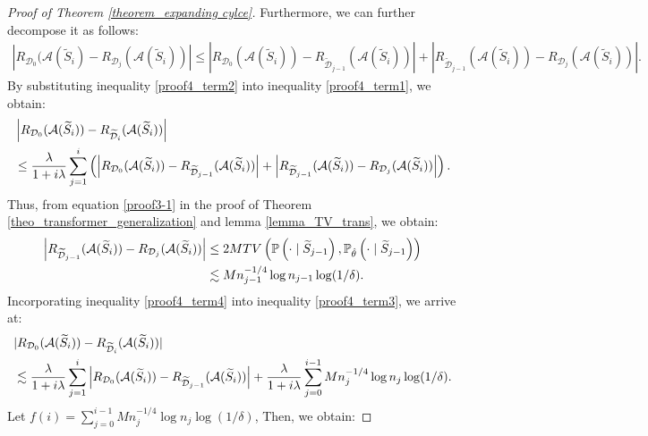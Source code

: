\begin{proof}[Proof of Theorem \ref{theorem_expanding cylce}]
Furthermore, we can further decompose it as follows:
\begin{align}
   \left|R_{\mathcal{D}_0}(\mathcal{A}(\widetilde{S}_i)-R_{\mathcal{D}_j}(\mathcal{A}(\widetilde{S}_i))\right| \leq \left|R_{\mathcal{D}_0}(\mathcal{A}(\widetilde{S}_i))-R_{\widetilde{\mathcal{D}}_{j-1}}(\mathcal{A}(\widetilde{S}_i))\right|+\left|R_{\widetilde{\mathcal{D}}_{j-1}}(\mathcal{A}(\widetilde{S}_i))-R_{\mathcal{D}_{j}}(\mathcal{A}(\widetilde{S}_i))\right|. \label{proof4_term2}
\end{align}
By substituting inequality \ref{proof4_term2} into inequality \ref{proof4_term1}, we obtain:
\begin{align}
    &\left|R_{\mathcal{D}_0}(\mathcal{A}(\widetilde{S}_i))-R_{\widetilde{\mathcal{D}}_i}(\mathcal{A}(\widetilde{S}_i))\right| \notag \\
    &\leq  \frac{\lambda}{1+i \lambda} \sum_{j=1}^i \left(\left|R_{\mathcal{D}_0}(\mathcal{A}(\widetilde{S}_i))-R_{\widetilde{\mathcal{D}}_{j-1}}(\mathcal{A}(\widetilde{S}_i))\right|+\left|R_{\widetilde{\mathcal{D}}_{j-1}}(\mathcal{A}(\widetilde{S}_i))-R_{\mathcal{D}_{j}}(\mathcal{A}(\widetilde{S}_i))\right| \right)\label{proof4_term3}.
\end{align}
Thus, from equation \ref{proof3-1} in the proof of Theorem \ref{theo_transformer_generalization} and lemma \ref{lemma_TV_trans}, we obtain:
\begin{align}
    \left|R_{\widetilde{\mathcal{D}}_{j-1}}(\mathcal{A}(\widetilde{S}_i))-R_{\mathcal{D}_{j}}(\mathcal{A}(\widetilde{S}_i))\right| &\leq  2 M T V\left(\mathbb{P}\left(\cdot \mid \widetilde{S}_{j-1}\right), \mathbb{P}_{\hat{\theta}}\left(\cdot \mid \widetilde{S}_{j-1}\right)\right)\notag \\
   & \lesssim Mn_{j-1}^{-1/4}\log n_{j-1} \log (1/\delta)\label{proof4_term4}.
\end{align}
Incorporating inequality \ref{proof4_term4} into inequality \ref{proof4_term3}, we arrive at:
\begin{align}
    &|R_{\mathcal{D}_0}(\mathcal{A}(\widetilde{S}_i))-R_{\widetilde{\mathcal{D}}_i}(\mathcal{A}(\widetilde{S}_i))|\notag \\
    &\lesssim\frac{\lambda}{1+i \lambda} \sum_{j=1}^i \left|R_{\mathcal{D}_0}(\mathcal{A}(\widetilde{S}_i))-R_{\widetilde{\mathcal{D}}_{j-1}}(\mathcal{A}(\widetilde{S}_i))\right|+\frac{\lambda}{1+i \lambda}\sum_{j=0}^{i-1}Mn_j^{-1/4}\log n_j \log (1/\delta)\label{proof4_term5}.
\end{align}
Let $f(i)=\sum_{j=0}^{i-1}Mn_j^{-1/4}\log n_j \log (1/\delta)$, Then, we obtain:

\end{proof}
